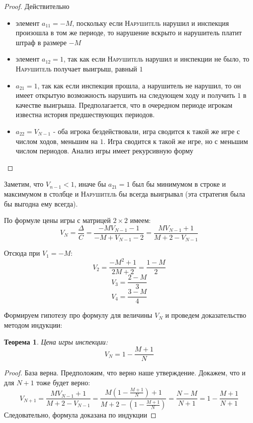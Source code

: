 \documentclass[aps,%
12pt,%
final,%
oneside,
onecolumn,%
musixtex, %
superscriptaddress,%
centertags]{article} %
\theoremstyle{plain}
\newtheorem{theorem}{Теорема}[section] %
\theoremstyle{definition}
\theoremstyle{remark}
\begin{document}
\begin{proof}
  Действительно

  \begin{itemize}
    \item элемент $a_{11} = - M$, поскольку если \textsc{Нарушитель} нарушил и инспекция произошла в том же периоде, то нарушение вскрыто и нарушитель платит штраф в размере $-M$
    \item элемент $a_{12} = 1$, так как если \textsc{Нарушитель} нарушил и инспекции не было, то \textsc{Нарушитель} получает выигрыш, равный $1$
    \item $a_{21}=1$, так как если инспекция прошла, а нарушитель не нарушил, то он имеет открытую возможность нарушить на следующем ходу и получить $1$ в качестве выигрыша. Предполагается, что в очередном периоде игрокам известна история предшествующих периодов.
    \item $a_{22} = V_{N-1}$ - оба игрока бездействовали, игра сводится к такой же игре с числом ходов, меньшим на $1$. Игра сводится к такой же игре, но с меньшим числом периодов. Анализ игры имеет рекурсивную форму
  \end{itemize}
\end{proof}

Заметим, что $V_{n-1}<1$, иначе бы $a_{21}=1$ был бы минимумом в строке и максимумом в столбце и \textsc{Нарушитель} бы всегда выигрывал (эта стратегия была бы выгодна ему всегда).

По формуле цены игры с матрицей $2\times 2$ имеем:
$$V_N = \frac{\Delta}{C} = \frac{-MV_{N-1}-1}{-M+V_{N-1}-2} = \frac{MV_{N-1}+1}{M+2-V_{N-1}}$$

Отсюда при $V_1 = -M$:
$$V_2 = \frac{-M^2+1}{2M+2} = \frac{1-M}{2}$$
$$V_3 = \frac{2-M}{3}$$
$$V_4 = \frac{3-M}{4}$$

Формируем гипотезу про формулу для величины $V_N$ и проведем доказательство методом индукции:

\begin{theorem}
  Цена игры инспекции:
  $$V_N = 1 - \frac{M+1}{N}$$
\end{theorem}
\begin{proof}
  База верна. Предположим, что верно наше утверждение. Докажем, что и для $N+1$ тоже будет верно:
  $$V_{N+1} = \frac{MV_{N-1}+1}{M+2-V_{N-1}} = \frac{M\left(1 - \frac{M+1}{N}\right)+1}{M+2-\left(1 - \frac{M+1}{N}\right)} = \frac{N-M}{N+1} = 1 - \frac{M+1}{N+1}$$
  Следовательно, формула доказана по индукции
\end{proof}
\end{document}
